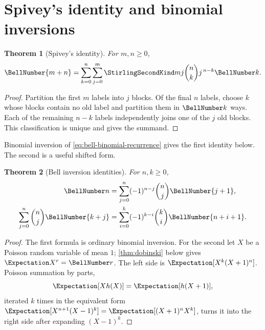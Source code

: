 \documentclass[11pt,a4paper,oneside,openany]{book}
\newtheorem{theorem}{Theorem}[chapter]
\theoremstyle{definition}
\theoremstyle{remark}
\begin{document}
\section{Spivey's identity and binomial inversions}
\begin{theorem}[Spivey's identity]\label{thm:spivey}
For $m,n\ge0$,
\begin{equation}\label{eq:spivey}
 \BellNumber{m+n}=\sum_{k=0}^{n}\sum_{j=0}^{m}
 \StirlingSecondKind mj\binom nk j^{\,n-k}\BellNumber k.
\end{equation}
\end{theorem}
\begin{proof}
Partition the first $m$ labels into $j$ blocks.  Of the final $n$ labels, choose
$k$ whose blocks contain no old label and partition them in $\BellNumber k$ ways.  Each
of the remaining $n-k$ labels independently joins one of the $j$ old blocks.  This
classification is unique and gives the summand.
\end{proof}

Binomial inversion of \eqref{eq:bell-binomial-recurrence} gives the first identity
below.  The second is a useful shifted form.
\begin{theorem}[Bell inversion identities]\label{thm:bell-inversions}
For $n,k\ge0$,
\begin{align}
 \BellNumber n&=\sum_{j=0}^{n}(-1)^{n-j}\binom nj\BellNumber{j+1},
 \label{eq:bell-inversion-one}\\
 \sum_{j=0}^{n}\binom nj\BellNumber{k+j}
 &=\sum_{i=0}^{k}(-1)^{k-i}\binom ki\BellNumber{n+i+1}.
 \label{eq:bell-inversion-two}
\end{align}
\end{theorem}
\begin{proof}
The first formula is ordinary binomial inversion.  For the second let $X$ be a
Poisson random variable of mean $1$; \cref{thm:dobinski} below gives
$\Expectation X^r=\BellNumber r$.  The left side is
$\Expectation[X^k(X+1)^n]$.  Poisson summation by parts,
\begin{equation}\label{eq:poisson-sbp}
 \Expectation[Xh(X)]=\Expectation[h(X+1)],
\end{equation}
iterated $k$ times in the equivalent form
$\Expectation[X^{n+1}(X-1)^k]=\Expectation[(X+1)^nX^k]$, turns it into the right side after expanding
$(X-1)^k$.
\end{proof}
\end{document}
